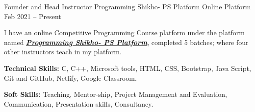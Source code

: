 \begin{cventries}
  \cventry
    {Founder and Head Instructor} %
    {Programming Shikho-  PS Platform} %
    {Online Platform} %
    {Feb 2021 – Present} %
    {
      \begin{cvitems} %
        \item {I have an online Competitive Programming Course platform under the platform named \href{https://choloprogrammingshikhi.vercel.app/}{\textbf{\textit{Programming Shikho-  PS Platform}}}, completed 5 batches; where four other instructors teach in my platform.}
        \item {\textbf{Technical Skills:} C, C++, Microsoft tools, HTML, CSS, Bootstrap, Java Script, Git and GitHub, Netlify, Google Classroom.}
        \item {\textbf{Soft Skills:} Teaching, Mentor-ship, Project Management and Evaluation, Communication, Presentation skills, Consultancy.}
      \end{cvitems}
    }

\end{cventries}
